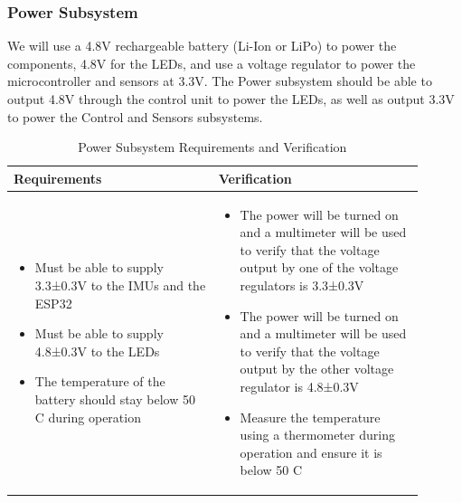 \documentclass[12pt]{article}
\begin{document}
    \subsubsection{Power Subsystem} 
	We will use a 4.8V rechargeable battery (Li-Ion or LiPo) to 
    power the components, 4.8V for the LEDs, and use a voltage 
    regulator \cite{TI2023} to power the microcontroller and sensors at 3.3V. 
    The Power subsystem should be able to output 4.8V through the control unit to power the LEDs, as well as output 3.3V to power the Control and Sensors subsystems. 
    \begin{table}[h]
        \centering
        \caption{Power Subsystem Requirements and Verification}
        \begin{tabular}{p{0.45\linewidth}p{0.45\linewidth}}
        \toprule
        \textbf{Requirements} & \textbf{Verification} \\
        \midrule
        \begin{itemize}[leftmargin=*, nosep, after=\strut]
            \item Must be able to supply 3.3±0.3V to the IMUs and the ESP32
            \item Must be able to supply 4.8±0.3V to the LEDs
            \item The temperature of the battery should stay below 50 C during operation
            
        \end{itemize} &
        \begin{itemize}[leftmargin=*, nosep, after=\strut]
            \item The power will be turned on and a multimeter will be used to verify that the voltage output by one of the voltage regulators is 3.3±0.3V
            \item The power will be turned on and a multimeter will be used to verify that the voltage output by the other voltage regulator is 4.8±0.3V
            \item Measure the temperature using a thermometer during operation and ensure it is below 50 C
        \end{itemize} \\
        \bottomrule
        \end{tabular}
        \end{table}
\end{document}
